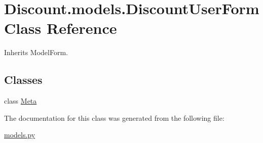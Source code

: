 \hypertarget{class_discount_1_1models_1_1_discount_user_form}{}\section{Discount.\+models.\+Discount\+User\+Form Class Reference}
\label{class_discount_1_1models_1_1_discount_user_form}


Inherits Model\+Form.

\subsection*{Classes}
\begin{DoxyCompactItemize}
\item 
class \hyperlink{class_discount_1_1models_1_1_discount_user_form_1_1_meta}{Meta}
\end{DoxyCompactItemize}


The documentation for this class was generated from the following file\+:\begin{DoxyCompactItemize}
\item 
\hyperlink{models_8py}{models.\+py}\end{DoxyCompactItemize}
